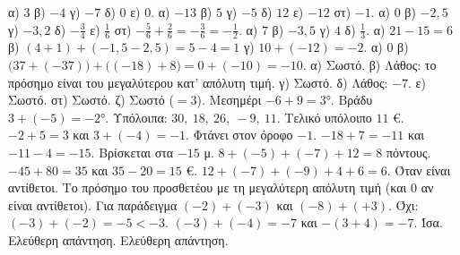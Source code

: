  α) $3$ \quad β) $-4$ \quad γ) $-7$ \quad δ) $0$ \quad ε) $0$.
 α) $-13$ \quad β) $5$ \quad γ) $-5$ \quad δ) $12$ \quad ε) $-12$ \quad στ) $-1$.
 α) $0$ \quad β) $-2{,}5$ \quad γ) $-3{,}2$ \quad δ) $-\frac{3}{4}$ \quad ε) $\frac{1}{6}$ \quad στ) $-\frac{5}{6}+\frac{2}{6}=-\frac{3}{6}=-\frac{1}{2}$.
 α) $7$ \quad β) $-3{,}5$ \quad γ) $4$ \quad δ) $\frac{1}{3}$.
 α) $21-15=6$ \quad β) $(4+1)+(-1{,}5-2{,}5)=5-4=1$ \quad γ) $10+(-12)=-2$.
 α) $0$ \quad β) $\big(37+(-37)\big)+\big((-18)+8\big)=0+(-10)=-10$.
 α) Σωστό. β) Λάθος: το πρόσημο είναι του μεγαλύτερου κατ' απόλυτη τιμή. γ) Σωστό. δ) Λάθος: $-7$. ε) Σωστό. στ) Σωστό. ζ) Σωστό ($=3$).
 Μεσημέρι $-6+9=3$°. Βράδυ $3+(-5)=-2$°.
 Υπόλοιπα: $30,\ 18,\ 26,\ -9,\ 11$. Τελικό υπόλοιπο $11$ €.
 $-2+5=3$ και $3+(-4)=-1$. Φτάνει στον όροφο $-1$.
 $-18+7=-11$ και $-11-4=-15$. Βρίσκεται στα $-15$ μ.
 $8+(-5)+(-7)+12=8$ πόντους.
 $-45+80=35$ και $35-20=15$ €.
 $12+(-7)+(-9)+4+6=6$.
 Όταν είναι αντίθετοι.
 Το πρόσημο του προσθετέου με τη μεγαλύτερη απόλυτη τιμή (και $0$ αν είναι αντίθετοι).
 Για παράδειγμα $(-2)+(-3)$ και $(-8)+(+3)$.
 Όχι: $(-3)+(-2)=-5<-3$.
 $(-3)+(-4)=-7$ και $-(3+4)=-7$. Ίσα.
 Ελεύθερη απάντηση.
 Ελεύθερη απάντηση.
